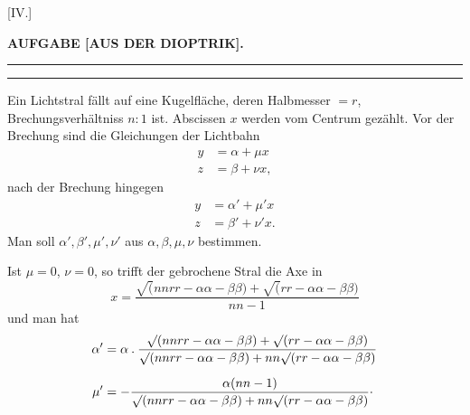 \clearpage\begingroup
{}\NoSourceHead
\newcommand{\IVpoint}{\mathpunct{\vcenter{\hbox{.}}}}
\begin{center}
[IV.]\par\bigskip
\textbf{AUFGABE [AUS DER DIOPTRIK].}\par\medskip
\rule{.40\linewidth}{.4pt}\par
[Aus Handbuch 19, Be, S. 90.]\par
\rule{.40\linewidth}{.4pt}
\end{center}
\noindent\hspace*{\parindent}Ein Lichtstral fällt auf eine Kugelfläche, deren Halbmesser $=r$, Brechungsverhältniss $n:1$ ist. Abscissen $x$ werden vom Centrum gezählt. Vor der Brechung sind die Gleichungen der Lichtbahn
\[
\begin{aligned}
y&=\alpha+\mu x\\
z&=\beta+\nu x,
\end{aligned}
\]
\noindent nach der Brechung hingegen
\[
\begin{aligned}
y&=\alpha'+\mu'x\\
z&=\beta'+\nu'x.
\end{aligned}
\]
\noindent Man soll $\alpha',\beta',\mu',\nu'$ aus $\alpha,\beta,\mu,\nu$ bestimmen.

Ist $\mu=0$, $\nu=0$, so trifft der gebrochene Stral die Axe in
\[
x=\frac{\surd(nnrr-\alpha\alpha-\beta\beta)+\surd(rr-\alpha\alpha-\beta\beta)}{nn-1}
\]
\noindent und man hat
\[
\begin{aligned}
\alpha'&=\alpha\mathbin{.}\frac{\surd(nnrr-\alpha\alpha-\beta\beta)+\surd(rr-\alpha\alpha-\beta\beta)}{\surd(nnrr-\alpha\alpha-\beta\beta)+nn\surd(rr-\alpha\alpha-\beta\beta)}\\[6pt]
\mu'&=-\frac{\alpha(nn-1)}{\surd(nnrr-\alpha\alpha-\beta\beta)+nn\surd(rr-\alpha\alpha-\beta\beta)}\IVpoint
\end{aligned}
\]

